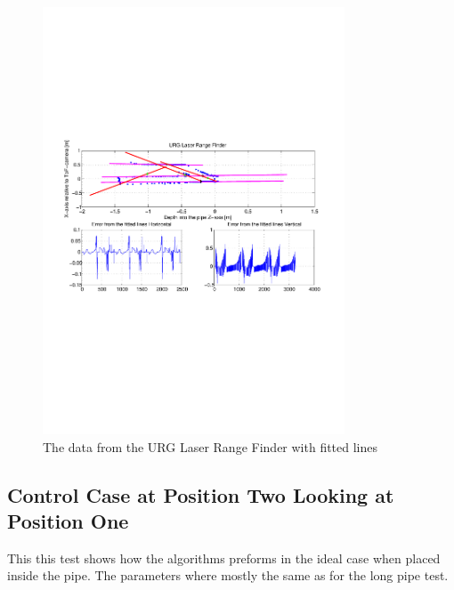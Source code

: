 \begin{figure}[htbp]
    \centering
    \includegraphics[width=0.8\textwidth]{pics/longpipe-urg-2d}
    \caption{The data from the URG Laser Range Finder with fitted lines}
    \label{chap7:fig-longpipe-urg-2d}
\end{figure}

\subsection{Control Case at Position Two Looking at Position One}
This this test shows how the algorithms preforms in the ideal case when placed inside the
pipe. The parameters where mostly the same as for the long pipe test.

